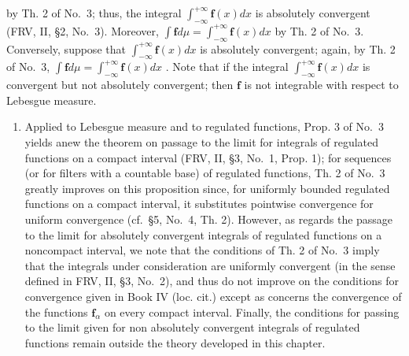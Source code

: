 by Th. 2 of No.~3; thus, the integral \(\int_{-\infty}^{+\infty} \mathbf{f}(x) dx\) is absolutely convergent (FRV, II, §2, No.~3). Moreover, \(\int \mathbf{f} d\mu = \int_{-\infty}^{+\infty} \mathbf{f}(x) dx\) by Th. 2 of No.~3. Conversely, suppose that \(\int_{-\infty}^{+\infty} \mathbf{f}(x) dx\) is absolutely convergent; again, by Th. 2 of No.~3, \(\int \mathbf{f} d\mu = \int_{-\infty}^{+\infty} \mathbf{f}(x) dx\) . Note that if the integral \(\int_{-\infty}^{+\infty} \mathbf{f}(x) dx\) is convergent but not absolutely convergent; then \(\mathbf{f}\) is not integrable with respect to Lebesgue measure.

\begin{enumerate}
\def\labelenumi{\arabic{enumi})}
\setcounter{enumi}{1}
\tightlist
\item
  Applied to Lebesgue measure and to regulated functions, Prop. 3 of No.~3 yields anew the theorem on passage to the limit for integrals of regulated functions on a compact interval (FRV, II, §3, No.~1, Prop. 1); for sequences (or for filters with a countable base) of regulated functions, Th. 2 of No.~3 greatly improves on this proposition since, for uniformly bounded regulated functions on a compact interval, it substitutes pointwise convergence for uniform convergence (cf.~§5, No.~4, Th. 2). However, as regards the passage to the limit for absolutely convergent integrals of regulated functions on a noncompact interval, we note that the conditions of Th. 2 of No.~3 imply that the integrals under consideration are uniformly convergent (in the sense defined in FRV, II, §3, No.~2), and thus do not improve on the conditions for convergence given in Book IV (loc. cit.) except as concerns the convergence of the functions \(\mathbf{f}_{\alpha}\) on every compact interval. Finally, the conditions for passing to the limit given for non absolutely convergent integrals of regulated functions remain outside the theory developed in this chapter.
\end{enumerate}

